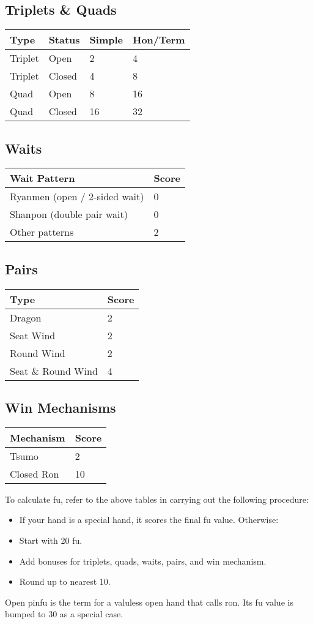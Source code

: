 \documentclass[8pt,a4paper]{extarticle}
\begin{document}
\begin{multicols*}{5}
\subsection*{Triplets \& Quads}
\small
\begin{tabularx}{\columnwidth}{llll}
\toprule
Type & Status & Simple & Hon/Term \\ \midrule
Triplet & Open & 2 & 4 \\
Triplet & Closed & 4 & 8 \\
Quad & Open & 8 & 16 \\
Quad & Closed & 16 & 32 \\ \bottomrule
\end{tabularx}
\subsection*{Waits}
\small
\begin{tabularx}{\columnwidth}{lX}
\toprule
Wait Pattern & Score \\ \midrule
Ryanmen (open / 2-sided wait) & 0 \\
Shanpon (double pair wait) & 0 \\
Other patterns & 2 \\ \bottomrule
\end{tabularx}
\subsection*{Pairs}
\small
\begin{tabularx}{\columnwidth}{lX}
\toprule
Type & Score \\ \midrule
Dragon & 2 \\
Seat Wind & 2 \\ 
Round Wind & 2 \\
Seat \& Round Wind & 4 \\ \bottomrule
\end{tabularx}
\subsection*{Win Mechanisms}
\begin{tabularx}{\columnwidth}{lX}
\toprule
Mechanism & Score \\ \midrule
Tsumo & 2 \\
Closed Ron & 10 \\
\bottomrule
\end{tabularx}
\smallbreak

To calculate fu, refer to the above tables in carrying out the following procedure:
\begin{itemize}[nolistsep,leftmargin=1em]
    \item If your hand is a special hand, it scores the final fu value. Otherwise:
    \item Start with 20 fu.
    \item Add bonuses for triplets, quads, waits, pairs, and win mechanism.
    \item Round up to nearest 10.
\end{itemize}
Open pinfu is the term for a valuless open hand that calls ron. Its fu value is bumped to 30 as a special case.

\end{multicols*}
\end{document}
